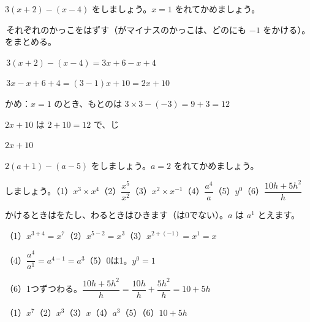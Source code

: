 \begin{reidai}
$3(x+2)-(x-4)$ をしましょう。$x=1$ をれてかめましょう。\par
\kangaekata {}\,それぞれのかっこをはずす（がマイナスのかっこは、どのにも $-1$ をかける）。\,をまとめる。\par
\shiki {}\,$3(x+2)-(x-4)=3x+6-x+4$\par
\hspace*{2.6\zw}\,$3x-x+6+4=(3-1)x+10=2x+10$\par
\hspace*{2.6\zw}かめ：$x=1$ のとき、もとのは $3\times3-(-3)=9+3=12$\par
\hspace*{6.6\zw}$2x+10$ は $2+10=12$ で、じ\par
\kotae $2x+10$
\end{reidai}

\begin{jibun}
$2(a+1)-(a-5)$ をしましょう。$a=2$ をれてかめましょう。
\end{jibun}

\begin{reidai}[\R{指数}{し|すう}のきまりを\R{使}{つか}う]
しましょう。\quad（1）\nobreak $x^3\times x^4$\quad（2）\nobreak $\dfrac{x^5}{x^2}$\quad（3）\nobreak $x^2\times x^{-1}$\quad（4）\nobreak $\dfrac{a^4}{a}$\quad（5）\nobreak $y^0$\quad（6）\nobreak $\dfrac{10h+5h^2}{h}$\par
\kangaekata かけるときはをたし、わるときはひきます（は0でない）。$a$ は $a^1$ とえます。\par
\shiki（1）$x^{3+4}=x^7$\quad（2）$x^{5-2}=x^3$\quad（3）$x^{2+(-1)}=x^1=x$\par
\hspace*{2.6\zw}（4）$\dfrac{a^4}{a^1}=a^{4-1}=a^3$\quad（5）0は1。$y^0=1$\par
\hspace*{2.6\zw}（6）1つずつわる。$\dfrac{10h+5h^2}{h}=\dfrac{10h}{h}+\dfrac{5h^2}{h}=10+5h$\par
\kotae（1）\nobreak $x^7$\quad（2）\nobreak $x^3$\quad（3）\nobreak $x$\quad（4）\nobreak $a^3$\quad（5）\quad（6）\nobreak $10+5h$
\end{reidai}

